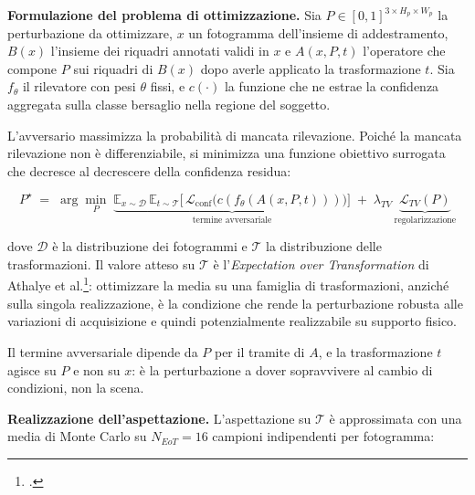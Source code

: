 

\textbf{Formulazione del problema di ottimizzazione.}
\label{sec:formulazione_eot}
Sia $P \in [0,1]^{3 \times H_p \times W_p}$ la perturbazione da ottimizzare,
$x$ un fotogramma dell'insieme di addestramento, $B(x)$ l'insieme dei riquadri
annotati validi in $x$ e $A(x, P, t)$ l'operatore che compone $P$ sui riquadri
di $B(x)$ dopo averle applicato la trasformazione $t$. Sia $f_\theta$ il
rilevatore con pesi $\theta$ fissi, e $c(\cdot)$ la funzione che ne estrae la
confidenza aggregata sulla classe bersaglio nella regione del soggetto.

L'avversario massimizza la probabilità di mancata rilevazione. Poiché la
mancata rilevazione non è differenziabile, si minimizza una funzione obiettivo
surrogata che decresce al decrescere della confidenza residua:

\begin{equation}
\label{eq:obiettivo_eot}
P^{\star} \;=\; \arg\min_{P} \;
\underbrace{\mathbb{E}_{x \sim \mathcal{D}} \,
\mathbb{E}_{t \sim \mathcal{T}}
\Big[\, \mathcal{L}_{\text{conf}}\big(c(f_\theta(A(x,P,t)))\big) \Big]}_{\text{termine avversariale}}
\;+\;
\lambda_{TV} \, \underbrace{\mathcal{L}_{TV}(P)}_{\text{regolarizzazione}}
\end{equation}

dove $\mathcal{D}$ è la distribuzione dei fotogrammi e $\mathcal{T}$ la
distribuzione delle trasformazioni. Il valore atteso su $\mathcal{T}$ è
l'\textit{Expectation over Transformation} di Athalye et
al.\footcite{athalye_2018_eot}: ottimizzare la media su una famiglia di
trasformazioni, anziché sulla singola realizzazione, è la condizione che rende
la perturbazione robusta alle variazioni di acquisizione e quindi
potenzialmente realizzabile su supporto fisico.

Il termine avversariale dipende da $P$ per il tramite di $A$, e la
trasformazione $t$ agisce su $P$ e non su $x$: è la perturbazione a dover
sopravvivere al cambio di condizioni, non la scena.

\textbf{Realizzazione dell'aspettazione.}
L'aspettazione su $\mathcal{T}$ è approssimata con una media di Monte Carlo su
$N_{EoT} = 16$ campioni indipendenti per fotogramma:

